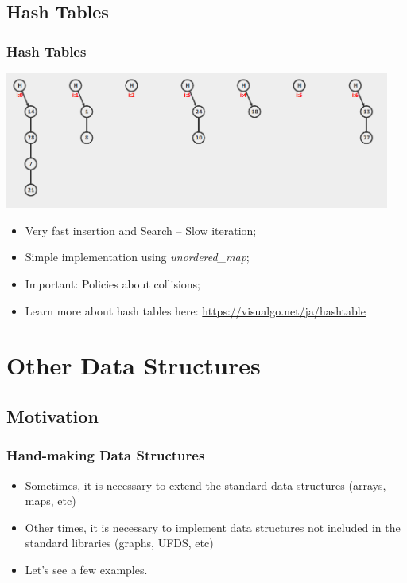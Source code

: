 \documentclass{beamer}
\begin{document}
\subsection{Hash Tables}
\begin{frame}[fragile]
  \frametitle{Hash Tables}

  \includegraphics[width=0.95\textwidth]{img/hash}

  \begin{itemize}
  \item Very fast insertion and Search -- Slow iteration;
  \item Simple implementation using \emph{unordered\_map};
  \item Important: Policies about collisions;
  \item Learn more about hash tables here: \url{https://visualgo.net/ja/hashtable}
  \end{itemize}
\end{frame}


\section{Other Data Structures}
\subsection{Motivation}
\begin{frame}
  \frametitle{Hand-making Data Structures}

  \begin{itemize}
  \item Sometimes, it is necessary to extend the standard data structures
    (arrays, maps, etc)
    \bigskip
    
  \item Other times, it is necessary to implement data structures not
    included in the standard libraries (graphs, UFDS, etc)
    \bigskip
    
  \item Let's see a few examples.
  \end{itemize}
\end{frame}
\end{document}
